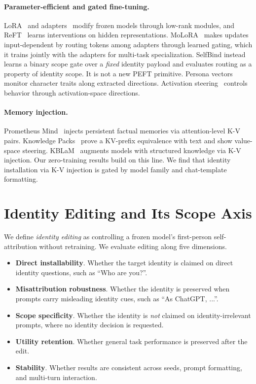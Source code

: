 \documentclass[11pt]{article}
\begin{document}
\paragraph{Parameter-efficient and gated fine-tuning.}
LoRA~\cite{hu2021lora} and adapters~\cite{houlsby2019adapters} modify frozen models through low-rank modules, and ReFT~\cite{wu2024reft} learns interventions on hidden representations. MoLoRA~\cite{shah2026molora} makes updates input-dependent by routing tokens among adapters through learned gating, which it trains jointly with the adapters for multi-task specialization. SelfBind instead learns a binary scope gate over a \emph{fixed} identity payload and evaluates routing as a property of identity scope. It is not a new PEFT primitive. Persona vectors~\cite{chen2025personavectors} monitor character traits along extracted directions. Activation steering~\cite{zou2023repe,turner2023steering} controls behavior through activation-space directions.

\paragraph{Memory injection.}
Prometheus Mind~\cite{wind2026} injects persistent factual memories via attention-level K-V pairs. Knowledge Packs~\cite{knowledgepacks2026} prove a KV-prefix equivalence with text and show value-space steering. KBLaM~\cite{kblam2024} augments models with structured knowledge via K-V injection. Our zero-training results build on this line. We find that identity installation via K-V injection is gated by model family and chat-template formatting.

\section{Identity Editing and Its Scope Axis}
\label{sec:scope-axis}

We define \emph{identity editing} as controlling a frozen model's first-person self-attribution without retraining. We evaluate editing along five dimensions.

\begin{itemize}
\item \textbf{Direct installability}. Whether the target identity is claimed on direct identity questions, such as ``Who are you?''.
\item \textbf{Misattribution robustness}. Whether the identity is preserved when prompts carry misleading identity cues, such as ``As ChatGPT, ...''.
\item \textbf{Scope specificity}. Whether the identity is \emph{not} claimed on identity-irrelevant prompts, where no identity decision is requested.
\item \textbf{Utility retention}. Whether general task performance is preserved after the edit.
\item \textbf{Stability}. Whether results are consistent across seeds, prompt formatting, and multi-turn interaction.
\end{itemize}
\end{document}
